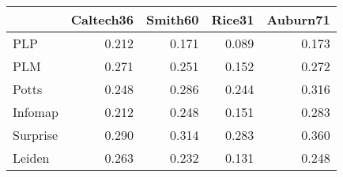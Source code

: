 \begin{tabular}{lrrrr}
\toprule
{} & Caltech36 & Smith60 & Rice31 & Auburn71 \\
\midrule
PLP      &     0.212 &   0.171 &  0.089 &    0.173 \\
PLM      &     0.271 &   0.251 &  0.152 &    0.272 \\
Potts    &     0.248 &   0.286 &  0.244 &    0.316 \\
Infomap  &     0.212 &   0.248 &  0.151 &    0.283 \\
Surprise &     0.290 &   0.314 &  0.283 &    0.360 \\
Leiden   &     0.263 &   0.232 &  0.131 &    0.248 \\
\bottomrule
\end{tabular}
